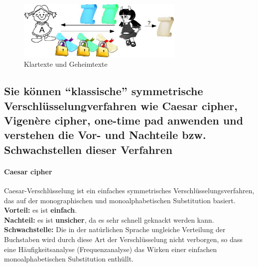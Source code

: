 \documentclass[10pt,a4paper]{article}
\begin{document}
\begin{itemize}[noitemsep,topsep=0pt,leftmargin=*]
    \begin{figure}[ht]
        \begin{center}
        \includegraphics[width=8cm]{images/cpa.png}
        \caption{Klartexte und Geheimtexte}
        \label{cpa}
        \end{center}
    \end{figure}
\end{itemize}


\subsection*{Sie können "`klassische"' symmetrische Verschlüsselungverfahren wie Caesar cipher, Vigenère cipher, one-time pad anwenden und verstehen die Vor- und Nachteile bzw. Schwachstellen dieser Verfahren}

\paragraph*{Caesar cipher}\label{para:Caesar cipher}Caesar-Verschlüsselung ist ein einfaches symmetrisches Verschlüsselungsverfahren, das auf der monographischen und monoalphabetischen Substitution basiert.\\
\textbf{Vorteil:} es ist \textbf{einfach}.\\
\textbf{Nachteil:} es ist \textbf{unsicher}, da es sehr schnell geknackt werden kann.\\
\textbf{Schwachstelle:} Die in der natürlichen Sprache ungleiche Verteilung der Buchstaben wird durch diese Art der Verschlüsselung nicht verborgen, so dass eine Häufigkeitsanalyse (Frequenzanalyse) das Wirken einer einfachen monoalphabetischen Substitution enthüllt.
\end{document}
